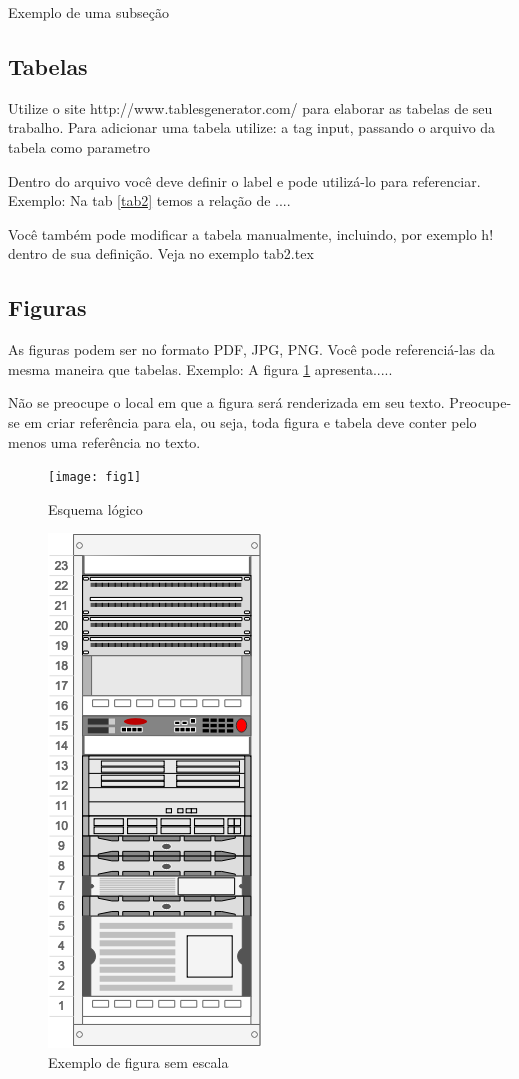 \documentclass[	DIV=calc,%
							paper=a4,%
							fontsize=12pt,%
							onecolumn]{scrartcl}	 					%
\begin{document}
Exemplo de uma subseção

\subsection{Tabelas}

Utilize o site http://www.tablesgenerator.com/ para elaborar as tabelas de seu trabalho.
Para adicionar uma tabela utilize: a tag input, passando o arquivo da tabela como parametro



Dentro do arquivo você deve definir o label e pode utilizá-lo para referenciar. Exemplo:
Na tab \ref{tab2} temos a relação de ....


Você também pode modificar a tabela manualmente, incluindo, por exemplo h! dentro de sua definição. Veja no exemplo tab2.tex

\subsection{Figuras}

As figuras podem ser no formato PDF, JPG, PNG. Você pode referenciá-las da mesma maneira que tabelas. Exemplo: A figura \ref{fig1} apresenta.....

Não se preocupe o local em que a figura será renderizada em seu texto. Preocupe-se em criar referência para ela, ou seja, toda figura e tabela deve conter pelo menos uma referência no texto.

\begin{figure}
\centering
\texttt{[image: fig1]}
\caption{Esquema lógico}
\label{fig1}
\end{figure}


\begin{figure}
	\centering
	\includegraphics[]{fig2}
	\caption{Exemplo de figura sem escala}
	\label{fig2}
\end{figure}
\end{document}

